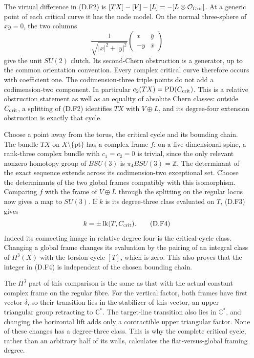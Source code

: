 The virtual difference in (D.F2) is
$[TX]-[V]-[L]=-[L\otimes\mathcal O_{\rm Crit}]$.
At a generic point of each critical curve it has the node model.
On the normal three-sphere of $xy=0$, the two columns
\[
 \frac1{\sqrt{|x|^2+|y|^2}}
   \begin{pmatrix}x&\overline y\\-y&\overline x\end{pmatrix}
 \tag{D.F3}
\]
give the unit $SU(2)$ clutch.  Its second-Chern obstruction is a
generator, up to the common orientation convention.  Every complex
critical curve therefore occurs with coefficient one.  The
codimension-three triple points do not add a codimension-two
component.  In particular $c_2(TX)=\operatorname{PD}(C_{\rm crit})$.
This is a relative obstruction statement as well as an equality of
absolute Chern classes: outside $C_{\rm crit}$, a splitting of
(D.F2) identifies $TX$ with $V\oplus L$, and its degree-four
extension obstruction is exactly that cycle.

Choose a point away from the torus, the critical cycle and its
bounding chain.  The bundle $TX$ on $X\setminus\{\mathrm{pt}\}$
has a complex frame $f$: on a five-dimensional spine, a rank-three
complex bundle with $c_1=c_2=0$ is trivial, since the only relevant
nonzero homotopy group of $BSU(3)$ is
$\pi_4BSU(3)=\mathbb Z$.
The determinant of the exact sequence extends across its
codimension-two exceptional set.  Choose the determinants of the
two global frames compatibly with this isomorphism.  Comparing
$f$ with the frame of $V\oplus L$ through the splitting on the
regular locus now gives a map to $SU(3)$.
If $k$ is its degree-three class evaluated on $T$, (D.F3) gives
\[
                   k=\pm\operatorname{lk}(T,C_{\rm crit}).
 \tag{D.F4}
\]
Indeed its connecting image in relative degree four is the
critical-cycle class.  Changing a global frame changes its
evaluation by the pairing of an integral class of $H^3(X)$ with
the torsion cycle $[T]$, which is zero.  This also proves that the
integer in (D.F4) is independent of the chosen bounding chain.

The $H^3$ part of this comparison is the same as that with the
actual constant complex frame on the regular fibre.  For the
vertical factor, both frames have first vector $\delta$, so their
transition lies in the stabilizer of this vector, an upper
triangular group retracting to $\mathbb C^*$.  The target-line
transition also lies in $\mathbb C^*$, and changing the horizontal
lift adds only a contractible upper triangular factor.  None of
these changes has a degree-three class.  This is why the complete
critical cycle, rather than an arbitrary half of its walls,
calculates the flat-versus-global framing degree.

